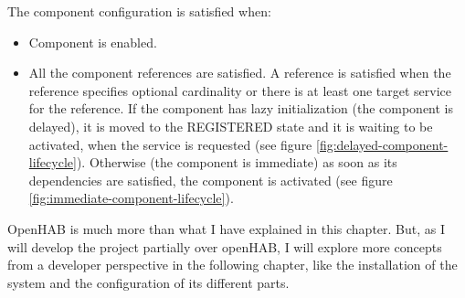 The component configuration is satisfied when:
\begin{itemize}
	\item Component is enabled.
	\item All the component references are satisfied. A reference is satisfied when the reference specifies optional cardinality or 
	there is at least one target service for the reference. If the component has lazy initialization (the component is delayed), it is 
	moved to the REGISTERED state and it is waiting to be activated, when the service is requested (see figure 
	\ref{fig:delayed-component-lifecycle}).
	Otherwise (the component is immediate) as soon as its dependencies are satisfied, the component is activated (see figure
	\ref{fig:immediate-component-lifecycle}).
\end{itemize}

\bigskip
OpenHAB is much more than what I have explained in this chapter. But, as I will develop the project partially over openHAB,
I will explore more concepts from a developer perspective in the following chapter, like the installation of the system and the
configuration of its different parts.